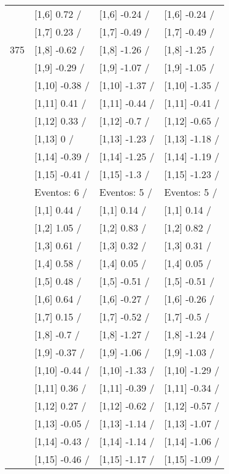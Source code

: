 \begin{table}
\begin{tabular}[t]{llll}
 & {}[1,6] 0.72  / & {}[1,6] -0.24  / & {}[1,6] -0.24  /\\
 & {}[1,7] 0.23  / & {}[1,7] -0.49  / & {}[1,7] -0.49  /\\
375 & {}[1,8] -0.62  / & {}[1,8] -1.26  / & {}[1,8] -1.25  /\\
\addlinespace
 & {}[1,9] -0.29  / & {}[1,9] -1.07  / & {}[1,9] -1.05  /\\
 & {}[1,10] -0.38  / & {}[1,10] -1.37  / & {}[1,10] -1.35  /\\
 & {}[1,11] 0.41  / & {}[1,11] -0.44  / & {}[1,11] -0.41  /\\
 & {}[1,12] 0.33  / & {}[1,12] -0.7  / & {}[1,12] -0.65  /\\
 & {}[1,13] 0  / & {}[1,13] -1.23  / & {}[1,13] -1.18  /\\
\addlinespace
 & {}[1,14] -0.39  / & {}[1,14] -1.25  / & {}[1,14] -1.19  /\\
 & {}[1,15] -0.41  / & {}[1,15] -1.3  / & {}[1,15] -1.23  /\\
 & Eventos:  6 / & Eventos:  5 / & Eventos:  5 /\\
 & {}[1,1] 0.44  / & {}[1,1] 0.14  / & {}[1,1] 0.14  /\\
 & {}[1,2] 1.05  / & {}[1,2] 0.83  / & {}[1,2] 0.82  /\\
\addlinespace
 & {}[1,3] 0.61  / & {}[1,3] 0.32  / & {}[1,3] 0.31  /\\
 & {}[1,4] 0.58  / & {}[1,4] 0.05  / & {}[1,4] 0.05  /\\
 & {}[1,5] 0.48  / & {}[1,5] -0.51  / & {}[1,5] -0.51  /\\
 & {}[1,6] 0.64  / & {}[1,6] -0.27  / & {}[1,6] -0.26  /\\
 & {}[1,7] 0.15  / & {}[1,7] -0.52  / & {}[1,7] -0.5  /\\
\addlinespace
500 & {}[1,8] -0.7  / & {}[1,8] -1.27  / & {}[1,8] -1.24  /\\
 & {}[1,9] -0.37  / & {}[1,9] -1.06  / & {}[1,9] -1.03  /\\
 & {}[1,10] -0.44  / & {}[1,10] -1.33  / & {}[1,10] -1.29  /\\
 & {}[1,11] 0.36  / & {}[1,11] -0.39  / & {}[1,11] -0.34  /\\
 & {}[1,12] 0.27  / & {}[1,12] -0.62  / & {}[1,12] -0.57  /\\
\addlinespace
 & {}[1,13] -0.05  / & {}[1,13] -1.14  / & {}[1,13] -1.07  /\\
 & {}[1,14] -0.43  / & {}[1,14] -1.14  / & {}[1,14] -1.06  /\\
 & {}[1,15] -0.46  / & {}[1,15] -1.17  / & {}[1,15] -1.09  /\\
\bottomrule
\end{tabular}
\end{table}
